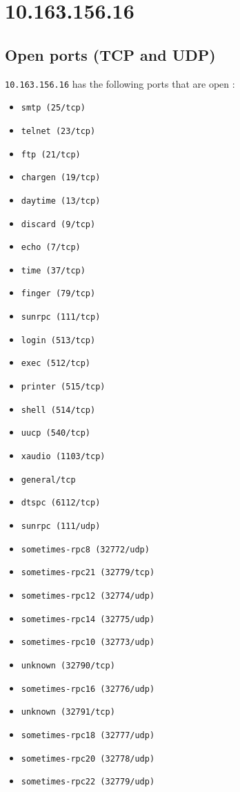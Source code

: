 \documentclass{article}
\begin{document}
\section{10.163.156.16}
\subsection{Open ports (TCP and UDP)}
\verb+10.163.156.16+ has the following ports that are open : 
\begin{itemize}
\item\verb+smtp (25/tcp)+
\item\verb+telnet (23/tcp)+
\item\verb+ftp (21/tcp)+
\item\verb+chargen (19/tcp)+
\item\verb+daytime (13/tcp)+
\item\verb+discard (9/tcp)+
\item\verb+echo (7/tcp)+
\item\verb+time (37/tcp)+
\item\verb+finger (79/tcp)+
\item\verb+sunrpc (111/tcp)+
\item\verb+login (513/tcp)+
\item\verb+exec (512/tcp)+
\item\verb+printer (515/tcp)+
\item\verb+shell (514/tcp)+
\item\verb+uucp (540/tcp)+
\item\verb+xaudio (1103/tcp)+
\item\verb+general/tcp+
\item\verb+dtspc (6112/tcp)+
\item\verb+sunrpc (111/udp)+
\item\verb+sometimes-rpc8 (32772/udp)+
\item\verb+sometimes-rpc21 (32779/tcp)+
\item\verb+sometimes-rpc12 (32774/udp)+
\item\verb+sometimes-rpc14 (32775/udp)+
\item\verb+sometimes-rpc10 (32773/udp)+
\item\verb+unknown (32790/tcp)+
\item\verb+sometimes-rpc16 (32776/udp)+
\item\verb+unknown (32791/tcp)+
\item\verb+sometimes-rpc18 (32777/udp)+
\item\verb+sometimes-rpc20 (32778/udp)+
\item\verb+sometimes-rpc22 (32779/udp)+

\end{itemize}
\end{document}
